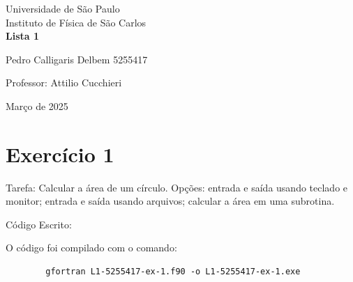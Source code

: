\documentclass[12pt, a4paper]{article} %
\begin{document}
	
	\begin{titlepage}
		\begin{center}
\Huge{Universidade de São Paulo}\\
\large{Instituto de Física de São Carlos}\\
\vspace{20pt}
\vspace{200pt}
\textbf{Lista 1}\\
\vspace{8cm}
		\end{center}

\begin{flushleft}
\begin{tabbing}
Pedro Calligaris Delbem 5255417\\
\end{tabbing}
\vspace{0.5cm}
Professor: Attilio Cucchieri\\		
		\end{flushleft}
	
		\begin{center}
			\vspace{\fill}
	Março de 2025	
		\end{center}
	\end{titlepage}

	\tableofcontents 
	\thispagestyle{empty}
	\newpage
\section{Exerc\'icio 1}

    Tarefa: Calcular a \'area de um c\'irculo. Op\c{c}\~oes: entrada e sa\'ida usando teclado e monitor; entrada e sa\'ida usando arquivos; calcular a  \'area em uma subrotina.

    C\'odigo Escrito:
    

    O c\'odigo foi compilado com o comando:
    \begin{verbatim}
        gfortran L1-5255417-ex-1.f90 -o L1-5255417-ex-1.exe
    \end{verbatim}
\end{document}
